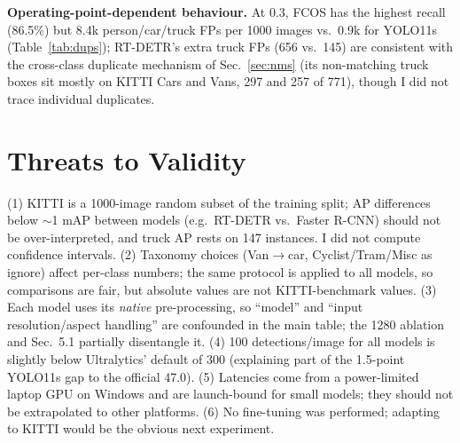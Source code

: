 \documentclass[10pt]{article}
\begin{document}
\textbf{Operating-point-dependent behaviour.} At 0.3, FCOS has the highest recall (86.5\%) but 8.4k person/car/truck FPs per 1000 images vs.\ 0.9k for YOLO11s (Table~\ref{tab:dups}); RT-DETR's extra truck FPs (656 vs.\ 145) are consistent with the cross-class duplicate mechanism of Sec.~\ref{sec:nms} (its non-matching truck boxes sit mostly on KITTI Cars and Vans, 297 and 257 of 771), though I did not trace individual duplicates.

\section{Threats to Validity}
(1) KITTI is a 1000-image random subset of the training split; AP differences below $\sim$1 mAP between models (e.g.\ RT-DETR vs.\ Faster R-CNN) should not be over-interpreted, and truck AP rests on 147 instances. I did not compute confidence intervals. (2) Taxonomy choices (Van$\rightarrow$car, Cyclist/Tram/Misc as ignore) affect per-class numbers; the same protocol is applied to all models, so comparisons are fair, but absolute values are not KITTI-benchmark values. (3) Each model uses its \emph{native} pre-processing, so ``model'' and ``input resolution/aspect handling'' are confounded in the main table; the 1280 ablation and Sec.~5.1 partially disentangle it. (4) 100 detections/image for all models is slightly below Ultralytics' default of 300 (explaining part of the 1.5-point YOLO11s gap to the official 47.0). (5) Latencies come from a power-limited laptop GPU on Windows and are launch-bound for small models; they should not be extrapolated to other platforms. (6) No fine-tuning was performed; adapting to KITTI would be the obvious next experiment.

\end{document}
